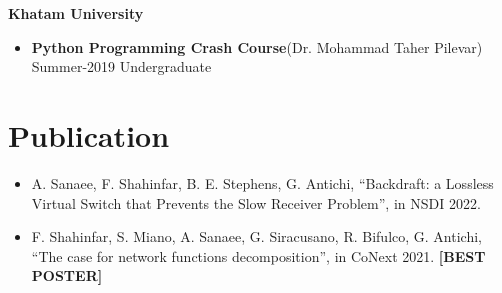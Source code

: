 \documentclass[11pt]{article}
\newcommand*{\taRecord}[4]{\textbf{#1}\quad (#3) \\ #2 \quad  #4}
\begin{document}
{
\renewcommand\labelitemi{}
\noindent \textbf{Khatam University} \par
\begin{itemize}[noitemsep,topsep=0pt,parsep=0pt,partopsep=0pt]
	\item \taRecord{Python Programming Crash Course}
		{Summer-2019}
		{Dr. Mohammad Taher Pilevar}
		{Undergraduate}
\end{itemize}
}

\section {Publication}
\begin{itemize}
    \item A. Sanaee, F. Shahinfar, B. E. Stephens, G. Antichi, ``Backdraft: a Lossless Virtual Switch that
        Prevents the Slow Receiver Problem'', in NSDI 2022.

    \item F. Shahinfar, S. Miano, A. Sanaee, G. Siracusano, R. Bifulco, G. Antichi,
        ``The case for network functions decomposition'', in CoNext 2021. \textbf{[BEST POSTER]}
\end{itemize}



\end{document}
